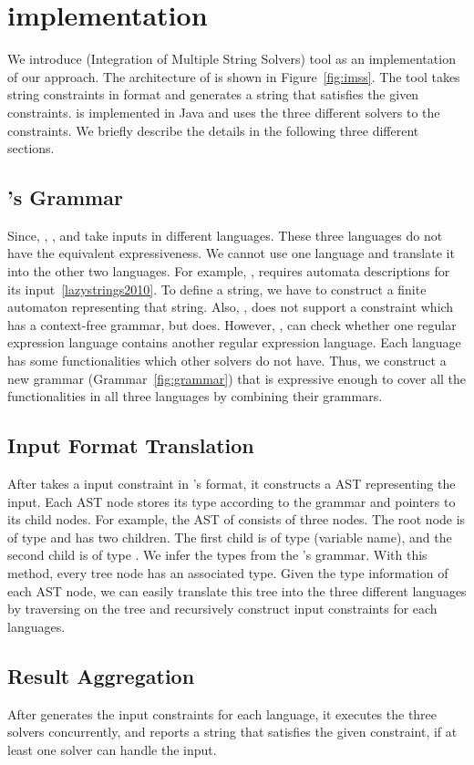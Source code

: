 \section{implementation}
\label{sec:implementation}
We introduce \imss (Integration of Multiple String Solvers) tool as
an implementation of our approach. The architecture of \imss is shown
in Figure~\ref{fig:imss}. The tool takes string constraints in \imss format
and generates a string that satisfies the given constraints. \imss is
implemented in Java and uses the three different solvers to the constraints.
We briefly describe the details in the following three different sections.

\subsection{\imss's Grammar}
Since, \hampi, \dprle, and \zstr take inputs in
 different languages. These three languages do not have the equivalent expressiveness.
 We cannot use one language and translate it into the other two languages. For example,
 \dprle, requires automata descriptions for its input~\ref{lazystrings2010}.
 To define a string, we have to construct a finite automaton representing that string.
 Also, \dprle, does not support a constraint which has a context-free grammar,
 but \hampi does. However, \dprle, can check whether one regular expression language
 contains another regular expression language. Each language has some functionalities which
 other solvers do not have. Thus, we construct a new grammar (Grammar~\ref{fig:grammar}) that is expressive enough to
 cover all the functionalities in all three languages by combining their grammars.

\subsection{Input Format Translation}
After \imss takes a input constraint in \imss's format, it constructs a AST representing the input.
Each AST node stores its type according to the grammar and pointers to its child nodes.
For example, the AST of  consists of three nodes. The root node is of type
 and has two children. The first child is of type  (variable name), and
the second child is of type . We infer the types from the \imss's grammar.
With this method, every tree node has an associated type. Given the type information of
each AST node, we can easily translate this tree into the three different languages by traversing
on the tree and recursively construct input constraints for each languages.

\subsection{Result Aggregation}
After \imss generates the input constraints for each language, it executes the three solvers concurrently, and
reports a string that satisfies the given constraint, if at least one solver can handle the input.

